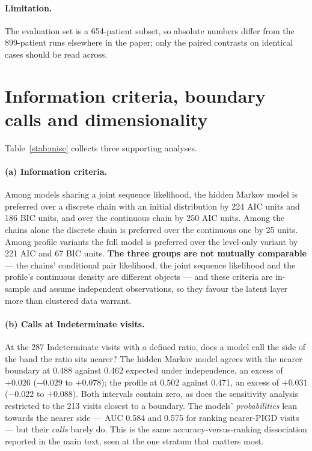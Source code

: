 \begin{table}[htbp]
\centering
\caption{Discrete latent clinical states against the subtype history and against
direct models on the same measurements. $^{\dagger}$The persistence rule's log
loss is reported clipped.}
\label{stab:clinical}
\footnotesize
\setlength{\tabcolsep}{4pt}

\end{table}

\paragraph{Limitation.} The evaluation set is a 654-patient subset, so absolute
numbers differ from the 899-patient runs elsewhere in the paper; only the paired
contrasts on identical cases should be read across.

\section{Information criteria, boundary calls and dimensionality}
\label{sup:misc}

Table~\ref{stab:misc} collects three supporting analyses.

\paragraph{(a) Information criteria.} Among models sharing a joint sequence
likelihood, the hidden Markov model is preferred over a discrete chain with an
initial distribution by 224 AIC units and 186 BIC units, and over the continuous
chain by 250 AIC units. Among the chains alone the discrete chain is preferred
over the continuous one by 25 units. Among profile variants the full model is
preferred over the level-only variant by 221 AIC and 67 BIC units. \textbf{The
three groups are not mutually comparable} --- the chains' conditional pair
likelihood, the joint sequence likelihood and the profile's continuous density
are different objects --- and these criteria are in-sample and assume independent
observations, so they favour the latent layer more than clustered data warrant.

\paragraph{(b) Calls at Indeterminate visits.} At the 287 Indeterminate visits
with a defined ratio, does a model call the side of the band the ratio sits
nearer? The hidden Markov model agrees with the nearer boundary at 0.488 against
0.462 expected under independence, an excess of $+0.026$ ($-0.029$ to $+0.078$);
the profile at 0.502 against 0.471, an excess of $+0.031$ ($-0.022$ to $+0.088$).
Both intervals contain zero, as does the sensitivity analysis restricted to the
213 visits closest to a boundary. The models' \emph{probabilities} lean towards
the nearer side --- AUC 0.584 and 0.575 for ranking nearer-PIGD visits --- but
their \emph{calls} barely do. This is the same accuracy-versus-ranking
dissociation reported in the main text, seen at the one stratum that matters most.

